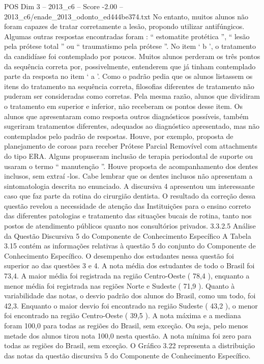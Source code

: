 \begin{textsample}{POS Dim 3 – 2013\_c6 – Score -2.00 – 2013\_c6/enade\_2013\_odonto\_ed444be374.txt}
No entanto, muitos alunos não foram capazes de tratar corretamente a lesão, propondo utilizar antifúngicos.
Algumas outras respostas encontradas foram : “ estomatite protética ”, “ lesão pela prótese total ” ou “ traumatismo pela prótese ”.
No item ‘ b ’, o tratamento da candidíase foi contemplado por poucos.
Muitos alunos perderam os três pontos da sequência correta por, possivelmente, entenderem que já tinham contemplado parte da resposta no item ‘ a ’.
Como o padrão pedia que os alunos listassem os itens do tratamento na sequência correta, filosofias diferentes de tratamento não puderam ser consideradas como corretas.
Pela mesma razão, alunos que dividiram o tratamento em superior e inferior, não receberam os pontos desse item.
Os alunos que apresentaram como resposta outros diagnósticos possíveis, também sugeriram tratamentos diferentes, adequados ao diagnóstico apresentado, mas não contemplados pelo padrão de respostas.
Houve, por exemplo, proposta de planejamento de coroas para receber Prótese Parcial Removível com attachments do tipo ERA.
Alguns propuseram inclusão de terapia periodontal de suporte ou usaram o termo “ manutenção ”.
Houve proposta de acompanhamento dos dentes inclusos, sem extraí -los.
Cabe lembrar que os dentes inclusos não apresentam a sintomatologia descrita no enunciado.
A discursiva 4 apresentou um interessante caso que faz parte da rotina do cirurgião dentista.
O resultado da correção dessa questão revelou a necessidade de atenção das Instituições para o ensino correto das diferentes patologias e tratamento das situações bucais de rotina, tanto nos postos de atendimento públicos quanto nos consultórios privados. 3.3.2.5 Análise da Questão Discursiva 5 do Componente de Conhecimento Específico A Tabela 3.15 contém as informações relativas à questão 5 do conjunto do Componente de Conhecimento Específico.
O desempenho dos estudantes nessa questão foi superior ao das questões 3 e 4.
A nota média dos estudantes de todo o Brasil foi 73,4.
A maior média foi registrada na região Centro-Oeste ( 78,4 ), enquanto a menor média foi registrada nas regiões Norte e Sudeste ( 71,9 ).
Quanto à variabilidade das notas, o desvio padrão dos alunos do Brasil, como um todo, foi 42,3.
Enquanto o maior desvio foi encontrado na região Sudeste ( 43,2 ), o menor foi encontrado na região Centro-Oeste ( 39,5 ).
A nota máxima e a mediana foram 100,0 para todas as regiões do Brasil, sem exceção.
Ou seja, pelo menos metade dos alunos tirou nota 100,0 nesta questão.
A nota mínima foi zero para todas as regiões do Brasil, sem exceção.
O Gráfico 3.22 representa a distribuição das notas da questão discursiva 5 do Componente de Conhecimento Específico.

\end{textsample}

